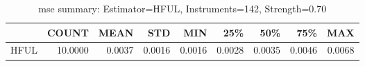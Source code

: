 \begin{table}[ht]
\centering
\caption{mse summary: Estimator=HFUL, Instruments=142, Strength=0.70}
\begin{tabular}{lrrrrrrrr}
\toprule
 & COUNT & MEAN & STD & MIN & 25\% & 50\% & 75\% & MAX \\
\midrule
HFUL & 10.0000 & 0.0037 & 0.0016 & 0.0016 & 0.0028 & 0.0035 & 0.0046 & 0.0068 \\
\bottomrule
\end{tabular}
\end{table}
